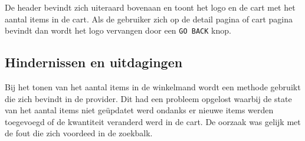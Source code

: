 De header bevindt zich uiteraard bovenaan en toont het logo en de cart met het aantal items in de cart. Als de gebruiker zich op de detail pagina of cart pagina bevindt dan wordt het logo vervangen door een \texttt{GO BACK} knop.

\subsection{Hindernissen en uitdagingen}

Bij het tonen van het aantal items in de winkelmand wordt een methode gebruikt die zich bevindt in de provider. Dit had een probleem opgelost waarbij de state van het aantal items niet geüpdatet werd ondanks er nieuwe items werden toegevoegd of de kwantiteit veranderd werd in de cart. De oorzaak was gelijk met de fout die zich voordeed in de zoekbalk.
